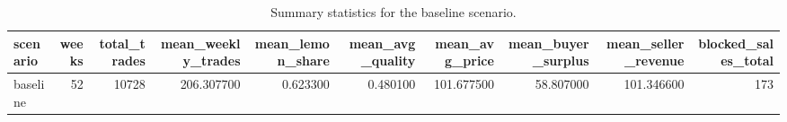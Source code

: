 \begin{table}
\caption{Summary statistics for the baseline scenario.}
\label{tab:baseline_summary}
\begin{tabular}{lrrrrrrrrr}
\toprule
scenario & weeks & total_trades & mean_weekly_trades & mean_lemon_share & mean_avg_quality & mean_avg_price & mean_buyer_surplus & mean_seller_revenue & blocked_sales_total \\
\midrule
baseline & 52 & 10728 & 206.307700 & 0.623300 & 0.480100 & 101.677500 & 58.807000 & 101.346600 & 173 \\
\bottomrule
\end{tabular}
\end{table}
